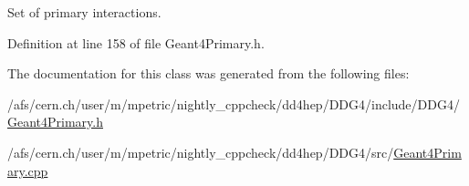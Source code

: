 Set of primary interactions. 



Definition at line 158 of file Geant4\+Primary.\+h.



The documentation for this class was generated from the following files\+:\begin{DoxyCompactItemize}
\item 
/afs/cern.\+ch/user/m/mpetric/nightly\+\_\+cppcheck/dd4hep/\+D\+D\+G4/include/\+D\+D\+G4/\hyperlink{_geant4_primary_8h}{Geant4\+Primary.\+h}\item 
/afs/cern.\+ch/user/m/mpetric/nightly\+\_\+cppcheck/dd4hep/\+D\+D\+G4/src/\hyperlink{_geant4_primary_8cpp}{Geant4\+Primary.\+cpp}\end{DoxyCompactItemize}
